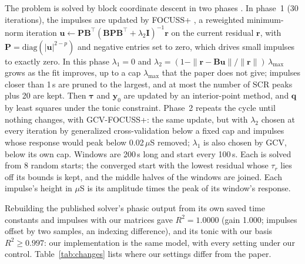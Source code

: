 \documentclass[conference]{IEEEtran}
\newcommand{\uS}{\,$\mu$S}
\begin{document}
The problem is solved by block coordinate descent in two phases \cite{amin2021}. In phase~1
(30 iterations), the impulses are updated by FOCUSS+ \cite{gorodnitsky1997}, a reweighted
minimum-norm iteration
$\mathbf{u}\leftarrow\mathbf{P}\mathbf{B}^{\top}(\mathbf{B}\mathbf{P}\mathbf{B}^{\top}
+\lambda_2\mathbf{I})^{-1}\mathbf{r}$ on the current residual $\mathbf{r}$, with
$\mathbf{P}=\mathrm{diag}(|\mathbf{u}|^{2-p})$ and negative entries set to zero, which drives
small impulses to exactly zero. In this phase $\lambda_1=0$ and
$\lambda_2=(1-\|\mathbf{r}-\mathbf{B}\mathbf{u}\|/\|\mathbf{r}\|)\,\lambda_{\max}$ grows as the
fit improves, up to a cap $\lambda_{\max}$ that the paper does not give; impulses closer than 1\,s are pruned to the largest, and at most
the number of SCR peaks plus 20 are kept. Then $\boldsymbol{\tau}$ and $\mathbf{y}_0$ are updated
by an interior-point method, and $\mathbf{q}$ by least squares under the tonic constraint.
Phase~2 repeats the cycle until nothing changes, with GCV-FOCUSS+: the same update, but with
$\lambda_2$ chosen at every iteration by generalized cross-validation \cite{golub1979} below a
fixed cap and impulses whose response would peak below 0.02\uS{} removed; $\lambda_1$ is also
chosen by GCV, below its own cap.
Windows are 200\,s long and start every 100\,s. Each is solved from 8 random starts; the converged
start with the lowest residual whose $\tau_r$ lies off its bounds is kept, and the middle halves
of the windows are joined. Each impulse's height in $\mu$S is its amplitude times the peak of its
window's response.

Rebuilding the published solver's phasic output from its own saved time constants and impulses
with our matrices gave $R^2=1.0000$ (gain 1.000; impulses offset by two samples, an indexing
difference), and its tonic with our basis $R^2\ge 0.997$: our implementation is the same model,
with every setting under our control. Table~\ref{tab:changes} lists where our settings differ from
the paper.
\end{document}
